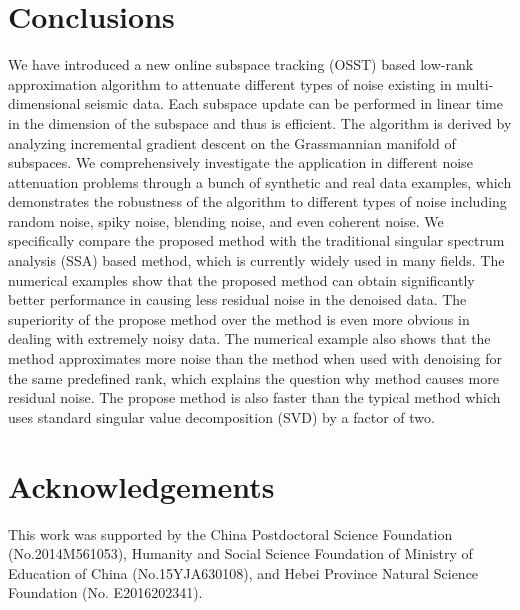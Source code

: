 \section{Conclusions}
We have introduced a new online subspace tracking (OSST) based low-rank approximation algorithm to attenuate different types of noise existing in multi-dimensional seismic data. Each subspace update can be performed in linear time in the dimension of the subspace and thus is efficient. The algorithm is derived by analyzing incremental gradient descent on the Grassmannian manifold of subspaces. We comprehensively investigate the application in different noise attenuation problems through a bunch of synthetic and real data examples, which demonstrates the robustness of the algorithm to different types of noise including random noise, spiky noise, blending noise, and even coherent noise. We specifically compare the proposed method with the traditional singular spectrum analysis (SSA) based method, which is currently widely used in many fields. The numerical examples show that the proposed method can obtain significantly better performance in causing less residual noise in the denoised data. The superiority of the propose method over the  method is even more obvious in dealing with extremely noisy data. The numerical example also shows that the  method approximates more noise than the  method when used with denoising for the same predefined rank, which explains the question why  method causes more residual noise. The propose method is also faster than the typical  method which uses standard singular value decomposition (SVD) by a factor of two.   

\section{Acknowledgements}
This work was supported by the China Postdoctoral Science Foundation (No.2014M561053), Humanity and Social Science Foundation of Ministry of Education of China (No.15YJA630108), and Hebei Province Natural Science Foundation (No. E2016202341).  %


